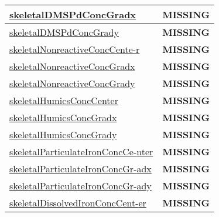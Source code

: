 {\begin{center}
\begin{longtable}{| p{2.0in} | p{4.0in} |}
    \hline
    \hyperref[subsec:var_sec_tracer_reconstruction_skeletalDMSPdConcGradx]{skeletalDMSPdConcGradx} & {\bf \color{red} MISSING} \\
    \hline
    \hyperref[subsec:var_sec_tracer_reconstruction_skeletalDMSPdConcGrady]{skeletalDMSPdConcGrady} & {\bf \color{red} MISSING} \\
    \hline
    \hyperref[subsec:var_sec_tracer_reconstruction_skeletalNonreactiveConcCenter]{skeletalNonreactiveConcCente-}\hyperref[subsec:var_sec_tracer_reconstruction_skeletalNonreactiveConcCenter]{r  }& {\bf \color{red} MISSING} \\
    \hline
    \hyperref[subsec:var_sec_tracer_reconstruction_skeletalNonreactiveConcGradx]{skeletalNonreactiveConcGradx} & {\bf \color{red} MISSING} \\
    \hline
    \hyperref[subsec:var_sec_tracer_reconstruction_skeletalNonreactiveConcGrady]{skeletalNonreactiveConcGrady} & {\bf \color{red} MISSING} \\
    \hline
    \hyperref[subsec:var_sec_tracer_reconstruction_skeletalHumicsConcCenter]{skeletalHumicsConcCenter} & {\bf \color{red} MISSING} \\
    \hline
    \hyperref[subsec:var_sec_tracer_reconstruction_skeletalHumicsConcGradx]{skeletalHumicsConcGradx} & {\bf \color{red} MISSING} \\
    \hline
    \hyperref[subsec:var_sec_tracer_reconstruction_skeletalHumicsConcGrady]{skeletalHumicsConcGrady} & {\bf \color{red} MISSING} \\
    \hline
    \hyperref[subsec:var_sec_tracer_reconstruction_skeletalParticulateIronConcCenter]{skeletalParticulateIronConcCe-}\hyperref[subsec:var_sec_tracer_reconstruction_skeletalParticulateIronConcCenter]{nter  }& {\bf \color{red} MISSING} \\
    \hline
    \hyperref[subsec:var_sec_tracer_reconstruction_skeletalParticulateIronConcGradx]{skeletalParticulateIronConcGr-}\hyperref[subsec:var_sec_tracer_reconstruction_skeletalParticulateIronConcGradx]{adx  }& {\bf \color{red} MISSING} \\
    \hline
    \hyperref[subsec:var_sec_tracer_reconstruction_skeletalParticulateIronConcGrady]{skeletalParticulateIronConcGr-}\hyperref[subsec:var_sec_tracer_reconstruction_skeletalParticulateIronConcGrady]{ady  }& {\bf \color{red} MISSING} \\
    \hline
    \hyperref[subsec:var_sec_tracer_reconstruction_skeletalDissolvedIronConcCenter]{skeletalDissolvedIronConcCent-}\hyperref[subsec:var_sec_tracer_reconstruction_skeletalDissolvedIronConcCenter]{er  }& {\bf \color{red} MISSING} \\

\end{longtable}
\end{center}}
